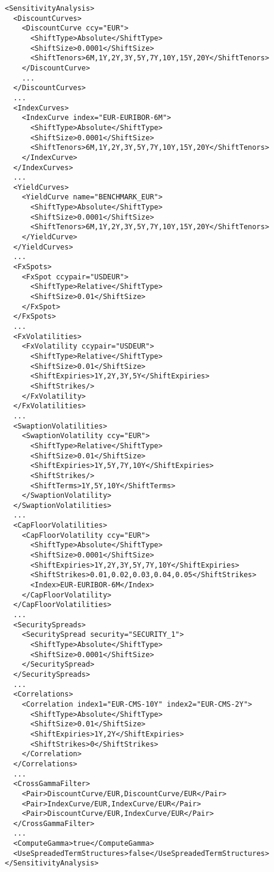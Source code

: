 \begin{longlisting}
  \begin{verbatim}
<SensitivityAnalysis>
  <DiscountCurves>
    <DiscountCurve ccy="EUR">
      <ShiftType>Absolute</ShiftType>
      <ShiftSize>0.0001</ShiftSize>
      <ShiftTenors>6M,1Y,2Y,3Y,5Y,7Y,10Y,15Y,20Y</ShiftTenors>
    </DiscountCurve>
    ...
  </DiscountCurves>
  ...
  <IndexCurves>
    <IndexCurve index="EUR-EURIBOR-6M">
      <ShiftType>Absolute</ShiftType>
      <ShiftSize>0.0001</ShiftSize>
      <ShiftTenors>6M,1Y,2Y,3Y,5Y,7Y,10Y,15Y,20Y</ShiftTenors>
    </IndexCurve>
  </IndexCurves>
  ...
  <YieldCurves>
    <YieldCurve name="BENCHMARK_EUR">
      <ShiftType>Absolute</ShiftType>
      <ShiftSize>0.0001</ShiftSize>
      <ShiftTenors>6M,1Y,2Y,3Y,5Y,7Y,10Y,15Y,20Y</ShiftTenors>
    </YieldCurve>
  </YieldCurves>
  ...
  <FxSpots>
    <FxSpot ccypair="USDEUR">
      <ShiftType>Relative</ShiftType>
      <ShiftSize>0.01</ShiftSize>
    </FxSpot>
  </FxSpots>
  ...
  <FxVolatilities>
    <FxVolatility ccypair="USDEUR">
      <ShiftType>Relative</ShiftType>
      <ShiftSize>0.01</ShiftSize>
      <ShiftExpiries>1Y,2Y,3Y,5Y</ShiftExpiries>
      <ShiftStrikes/>
    </FxVolatility>
  </FxVolatilities>
  ...
  <SwaptionVolatilities>
    <SwaptionVolatility ccy="EUR">
      <ShiftType>Relative</ShiftType>
      <ShiftSize>0.01</ShiftSize>
      <ShiftExpiries>1Y,5Y,7Y,10Y</ShiftExpiries>
      <ShiftStrikes/>
      <ShiftTerms>1Y,5Y,10Y</ShiftTerms>
    </SwaptionVolatility>
  </SwaptionVolatilities>
  ...
  <CapFloorVolatilities>
    <CapFloorVolatility ccy="EUR">
      <ShiftType>Absolute</ShiftType>
      <ShiftSize>0.0001</ShiftSize>
      <ShiftExpiries>1Y,2Y,3Y,5Y,7Y,10Y</ShiftExpiries>
      <ShiftStrikes>0.01,0.02,0.03,0.04,0.05</ShiftStrikes>
      <Index>EUR-EURIBOR-6M</Index>
    </CapFloorVolatility>
  </CapFloorVolatilities>
  ...
  <SecuritySpreads>
    <SecuritySpread security="SECURITY_1">
      <ShiftType>Absolute</ShiftType>
      <ShiftSize>0.0001</ShiftSize>
    </SecuritySpread>
  </SecuritySpreads>
  ...
  <Correlations>
    <Correlation index1="EUR-CMS-10Y" index2="EUR-CMS-2Y">
      <ShiftType>Absolute</ShiftType>
      <ShiftSize>0.01</ShiftSize>
      <ShiftExpiries>1Y,2Y</ShiftExpiries>
      <ShiftStrikes>0</ShiftStrikes>
    </Correlation>
  </Correlations>
  ...
  <CrossGammaFilter>
    <Pair>DiscountCurve/EUR,DiscountCurve/EUR</Pair>
    <Pair>IndexCurve/EUR,IndexCurve/EUR</Pair>
    <Pair>DiscountCurve/EUR,IndexCurve/EUR</Pair>
  </CrossGammaFilter>
  ...
  <ComputeGamma>true</ComputeGamma>
  <UseSpreadedTermStructures>false</UseSpreadedTermStructures>
</SensitivityAnalysis>
\end{verbatim}
\caption{Sensitivity configuration}
\label{lst:sensitivity_config}
\end{longlisting}

